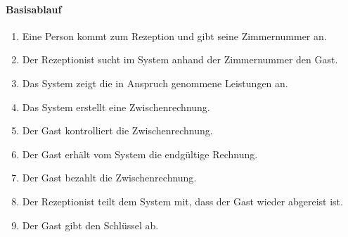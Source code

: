 \paragraph{Basisablauf}
\begin{enumerate}
	\item Eine Person kommt zum \Gls{Rezeption} und gibt seine \Gls{Zimmernummer} an.
	\item Der \Gls{Rezeptionist} sucht im System anhand der \Gls{Zimmernummer} den \Gls{Gast}.
	\item Das System zeigt die in Anspruch genommene Leistungen an.
    \item Das System erstellt eine \Gls{Zwischenrechnung}.
	\item Der \Gls{Gast} kontrolliert die \Gls{Zwischenrechnung}.
	\item Der \Gls{Gast} erhält vom System die endgültige \Gls{Rechnung}.
	\item Der \Gls{Gast} bezahlt die \Gls{Zwischenrechnung}.
	\item Der \Gls{Rezeptionist} teilt dem System mit, dass der \Gls{Gast} wieder abgereist ist.
	\item Der \Gls{Gast} gibt den Schlüssel ab.
\end{enumerate}


